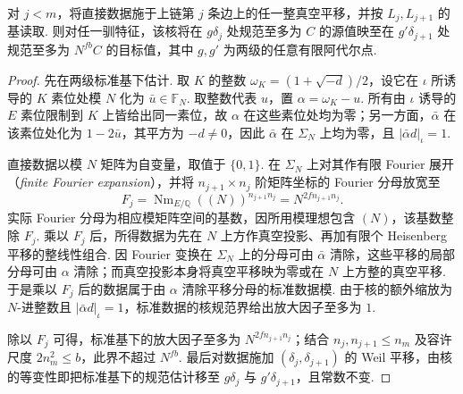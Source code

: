 \begin{lemma}[直接数据的单步规范]
\label{lem:a-level-direct-gauge}
\emitthmsource
对 $j<m$，将直接数据施于上链第 $j$ 条边上的任一整真空平移，并按 $L_j,L_{j+1}$ 的基读取. 则对任一驯特征，该核将在 $g\delta_j$ 处规范至多为 $C$ 的源值映至在 $g'\delta_{j+1}$ 处规范至多为 $N^{fb}C$ 的目标值，其中 $g,g'$ 为两级的任意有限阿代尔点.
\end{lemma}
\begin{proof}
先在两级标准基下估计. 取 $K$ 的整数 $\omega_K=(1+\sqrt{-d})/2$，设它在 $\iota$ 所诱导的 $K$ 素位处模 $N$ 化为 $\bar u\in\mathbb F_N$. 取整数代表 $u$，置 $\alpha=\omega_K-u$. 所有由 $\iota$ 诱导的 $E$ 素位限制到 $K$ 上皆给出同一素位，故 $\alpha$ 在这些素位处均为零；另一方面，$\bar\alpha$ 在该素位处化为 $1-2\bar u$，其平方为 $-d\ne0$，因此 $\bar\alpha$ 在 $\Sigma_N$ 上均为零，且 $|\bar\alpha d|_\iota=1$.

直接数据以模 $N$ 矩阵为自变量，取值于 $\{0,1\}$. 在 $\Sigma_N$ 上对其作有限 Fourier 展开（\emph{finite Fourier expansion}），并将 $n_{j+1}\times n_j$ 阶矩阵坐标的 Fourier 分母放宽至
\[
 F_j=\operatorname{Nm}_{E/\mathbb Q}((N))^{n_{j+1}n_j}
     =N^{2f n_{j+1}n_j}.
\]
实际 Fourier 分母为相应模矩阵空间的基数，因所用模理想包含 $(N)$，该基数整除 $F_j$. 乘以 $F_j$ 后，所得数据为先在 $N$ 上方作真空投影、再加有限个 Heisenberg 平移的整线性组合. 因 Fourier 变换在 $\Sigma_N$ 上的分母可由 $\bar\alpha$ 清除，这些平移的局部分母可由 $\alpha$ 清除；而真空投影本身将真空平移映为零或在 $N$ 上方整的真空平移. 于是乘以 $F_j$ 后的数据属于由 $\alpha$ 清除平移分母的标准数据模. 由于核的额外缩放为 $N$-进整数且 $|\bar\alpha d|_\iota=1$，标准数据的核规范界给出放大因子至多为 $1$.

除以 $F_j$ 可得，标准基下的放大因子至多为 $N^{2fn_{j+1}n_j}$；结合 $n_j,n_{j+1}\le n_m$ 及容许尺度 $2n_m^2\le b$，此界不超过 $N^{fb}$. 最后对数据施加 $(\delta_j,\delta_{j+1})$ 的 Weil 平移，由核的等变性即把标准基下的规范估计移至 $g\delta_j$ 与 $g'\delta_{j+1}$，且常数不变.
\end{proof}

